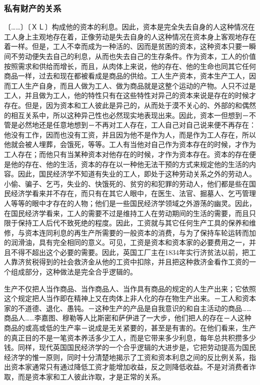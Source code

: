 \documentclass[a4paper,twoside,12pt]{ctexart}
\begin{document}
\subsubsection{私有财产的关系}
〔……〕〔ＸＬ〕构成他的资本的利息。因此，资本是完全失去自身的人这种情况在工人身上主观地存在着，正像劳动是失去自身的人这种情况在资本身上客观地存在着一样。但是，工人不幸而成为一种活的、因而是贫困的资本，这种资本只要一瞬间不劳动便失去自己的利息，从而也失去自己的生存条件。作为资本，工人的价值按照需求和供给而增长，而且，从肉体上来说，他的存在、他的生命也同其它任何商品一样，过去和现在都被看成是商品的供给。工人生产资本，资本生产工人，因而工人生产自身，而且人做为工人、做为商品就是这整个运动的产物。人只不过是工人，并且做为工人，他的特性只有在这些特性对异己的资本来说是存在的时候才存在。但是，因为资本和工人彼此是异己的，从而处于漠不关心的、外部的和偶然的相互关系中，所以这种异己性也必然现实地表现出来。因此，资本一但想到－不管是必然地还是任意地想到－不再对工人存在，工人自己对自己说来便不再存在：他没有工作，因而也没有工资，并且因为他不是作为人，而是作为工人存在，所以他就会被人埋葬，会饿死，等等。工人有当他对自己作为资本存在的时候，才作为工人存在；而他只有当某种资本对他存在的时候，才作为资本存在。资本的存在便是他的存在、他的生活，资本的存在以一种他无法干预的方式来规定他的生活的内容。因此，国民经济学不知道有失业的工人，即处于这种劳动关系之外的劳动人。小偷、骗子、乞丐，失业的、快饿死的、贫穷的和犯罪的劳动人，他们都是些在国民经济学看来并不存在，而只有在其它人眼中，在医生、法官、掘墓人、乞丐管理人等等的眼中才存在的人物；他们是一些国民经济学领域之外游荡的幽灵。因此，在国民经济学看来，工人的需要不过是维持工人在劳动期间的生活的需要，而且只限于保持工人后代不致死绝的程度。因此，工资就与其它任何生产工具的保养和维修，与资本连同利息的再生产所需要的一般资本的消费，与为了保持车轮运转而加的润滑油，具有完全相同的意义。可见，工资是资本和资本家的必要费用之一，并且不得不超出这个必要的需要。因此，英国工厂主在1834年实行济贫法以前，把工人靠济贫税得到的社会救济金从他的工资中扣除，并且把这种救济金看作工资的一个组成部分，这种做法是完全合乎逻辑的。

生产不仅把人当作商品、当作商品人、当作具有商品的规定的人生产出来；它依照这个规定把人当作即在精神上又在肉体上非人化的存在物生产出来。－工人和资本家的不道德、退化、愚钝。－这种生产的产品是自我意识的和自主活动的商品……商品人……李嘉图、穆勒等人比斯密和萨伊进了一大步，他们把人的存在－人这种商品的或高或低的生产率－说成是无关紧要的，甚至是有害的。在他们看来，生产的真正目的不是一笔资本养活多少工人，而是它带来多少利息，每年总共积攒多少钱。同样，现代英国国民经济学的一个合乎逻辑的大进步是，它把劳动提高为国民经济学的惟一原则，同时十分清楚地揭示了工资和资本利息之间的反比例关系，指出资本家通常只有通过降低工资才能增加收益，反之则降低收益。不是对消费者诈取，而是资本家和工人彼此诈取，才是正常的关系。
\end{document}
